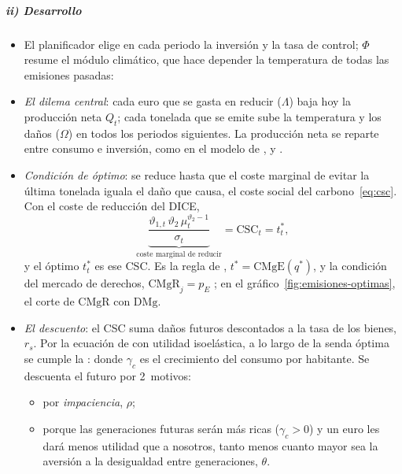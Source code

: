 \documentclass[11pt]{article}
\begin{document}
\subparagraph{ii) Desarrollo}

\begin{itemize}
\item El planificador elige en cada periodo la inversión y la tasa de control; $\Phi$ resume el módulo climático, que hace depender la temperatura de todas las emisiones pasadas:
\item \emph{El dilema central}: cada euro que se gasta en reducir ($\Lambda$) baja hoy la producción neta $Q_t$; cada tonelada que se emite sube la temperatura y los daños ($\Omega$) en todos los periodos siguientes. La producción neta se reparte entre consumo e inversión, como en el modelo de ,  y .
\item \emph{Condición de óptimo}: se reduce hasta que el coste marginal de evitar la última tonelada iguala el daño que causa, el coste social del carbono~\eqref{eq:csc}. Con el coste de reducción del DICE,
  \begin{equation}\label{eq:csc-impuesto}
  \underbrace{\frac{\vartheta_{1,t}\,\vartheta_2\,\mu_t^{\vartheta_2-1}}{\sigma_t}}_{\text{coste marginal de reducir}}=\mathrm{CSC}_t=t^*_t,
  \end{equation}
  y el  óptimo $t^*_t$ es ese CSC. Es la regla de , $t^*=\mathrm{CMgE}(q^*)$, y la condición del mercado de derechos, $\mathrm{CMgR}_j=p_E$ ; en el gráfico~\ref{fig:emisiones-optimas}, el corte de $\mathrm{CMgR}$ con $\mathrm{DMg}$.
\item \emph{El descuento}: el CSC suma daños futuros descontados a la tasa de los bienes, $r_s$. Por la ecuación de  con utilidad isoelástica, a lo largo de la senda óptima se cumple la \nocite{Ramsey1928Mathematical}:
  donde $\gamma_c$ es el crecimiento del consumo por habitante. Se descuenta el futuro por 2~motivos:
  \begin{itemize}
  \item por \emph{impaciencia}, $\rho$;
  \item porque las generaciones futuras serán más ricas ($\gamma_c>0$) y un euro les dará menos utilidad que a nosotros, tanto menos cuanto mayor sea la aversión a la desigualdad entre generaciones, $\theta$.
  \end{itemize}
\end{itemize}
\end{document}
